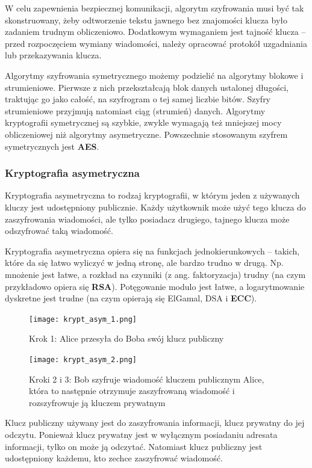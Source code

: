 \documentclass[a4paper,12pt,oneside]{book}
\begin{document}
				W celu zapewnienia bezpiecznej komunikacji, algorytm szyfrowania musi być tak skonstruowany, żeby odtworzenie tekstu jawnego bez znajomości klucza było zadaniem trudnym obliczeniowo. Dodatkowym wymaganiem jest tajność klucza – przed rozpoczęciem wymiany wiadomości, należy opracować protokół uzgadniania lub przekazywania klucza.
				
				Algorytmy szyfrowania symetrycznego możemy podzielić na algorytmy blokowe i strumieniowe. Pierwsze z nich przekształcają blok danych ustalonej długości, traktując go jako całość, na szyfrogram o tej samej liczbie bitów. Szyfry strumieniowe przyjmują natomiast ciąg (strumień) danych. Algorytmy kryptografii symetrycznej są szybkie, zwykle wymagają też mniejszej mocy obliczeniowej niż algorytmy asymetryczne. Powszechnie stosowanym szyfrem symetrycznych jest \textbf{AES}.
				
				\subsubsection*{Kryptografia asymetryczna}
				
				Kryptografia asymetryczna to rodzaj kryptografii, w którym jeden z używanych kluczy jest udostępniony publicznie. Każdy użytkownik może użyć tego klucza do zaszyfrowania wiadomości, ale tylko posiadacz drugiego, tajnego klucza może odszyfrować taką wiadomość.
				
				Kryptografia asymetryczna opiera się na funkcjach jednokierunkowych – takich, które da się łatwo wyliczyć w jedną stronę, ale bardzo trudno w drugą. Np. mnożenie jest łatwe, a rozkład na czynniki (z ang. faktoryzacja) trudny (na czym przykładowo opiera się \textbf{RSA}). Potęgowanie modulo jest łatwe, a logarytmowanie dyskretne jest trudne (na czym opierają się ElGamal, DSA i \textbf{ECC}).
				
				\begin{figure}[h]
					\centering\texttt{[image: krypt\_asym\_1.png]}
					\caption{Krok 1: Alice przesyła do Boba swój klucz publiczny}
					
					\hspace{5pt}
					
					\centering\texttt{[image: krypt\_asym\_2.png]}
					\caption{Kroki 2 i 3: Bob szyfruje wiadomość kluczem publicznym Alice, która to następnie otrzymuje zaszyfrowaną wiadomość i rozszyfrowuje ją kluczem prywatnym}
				\end{figure}
				
				Klucz publiczny używany jest do zaszyfrowania informacji, klucz prywatny do jej odczytu. Ponieważ klucz prywatny jest w wyłącznym posiadaniu adresata informacji, tylko on może ją odczytać. Natomiast klucz publiczny jest udostępniony każdemu, kto zechce zaszyfrować wiadomość.
				
\end{document}
